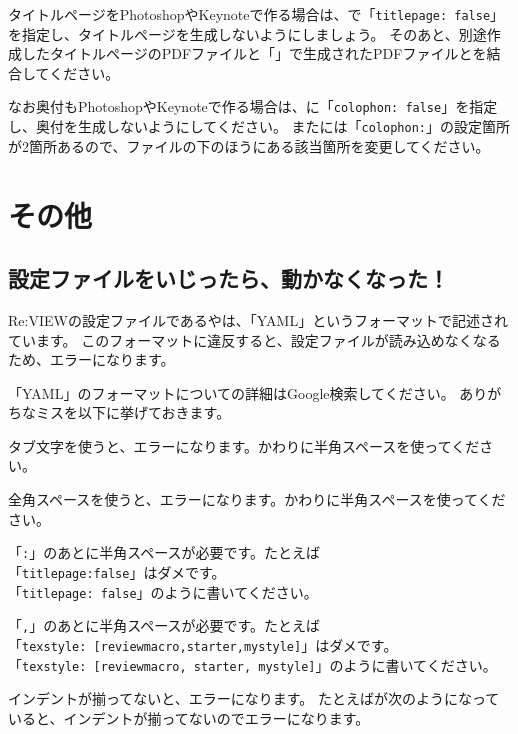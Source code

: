 タイトルページをPhotoshopやKeynoteで作る場合は、で「\texttt{titlepage: false}」を指定し、タイトルページを生成しないようにしましょう。
そのあと、別途作成したタイトルページのPDFファイルと「」で生成されたPDFファイルとを結合してください。

なお奥付もPhotoshopやKeynoteで作る場合は、に「\texttt{colophon: false}」を指定し、奥付を生成しないようにしてください。
またには「\texttt{colophon:}」の設定箇所が2箇所あるので、ファイルの下のほうにある該当箇所を変更してください。

\section{その他}
\label{sec:2-7}

\subsection*{設定ファイルをいじったら、動かなくなった！}
\label{sec:2-7-1}

Re:VIEWの設定ファイルであるやは、「YAML」というフォーマットで記述されています。
このフォーマットに違反すると、設定ファイルが読み込めなくなるため、エラーになります。

「YAML」のフォーマットについての詳細はGoogle検索してください。
ありがちなミスを以下に挙げておきます。

\begin{starteritemize}
\item タブ文字を使うと、エラーになります。かわりに半角スペースを使ってください。
\item 全角スペースを使うと、エラーになります。かわりに半角スペースを使ってください。
\item 「\texttt{:}」のあとに半角スペースが必要です。たとえば\\{}
   「\texttt{titlepage:false}」はダメです。\\{}
   「\texttt{titlepage: false}」のように書いてください。
\item 「\texttt{,}」のあとに半角スペースが必要です。たとえば\\{}
   「\texttt{texstyle: [reviewmacro,starter,mystyle]}」はダメです。\\{}
   「\texttt{texstyle: [reviewmacro, starter, mystyle]}」のように書いてください。
\item インデントが揃ってないと、エラーになります。
   たとえばが次のようになっていると、インデントが揃ってないのでエラーになります。
\end{starteritemize}

